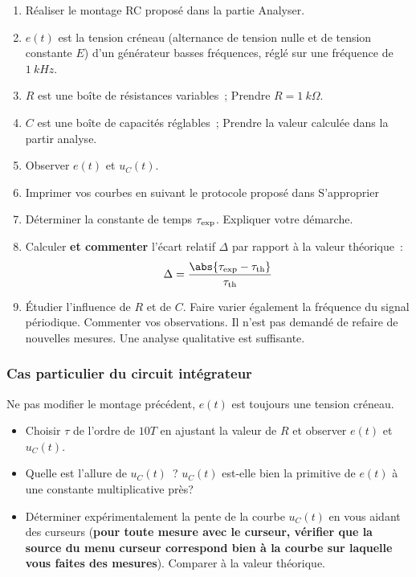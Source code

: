 \documentclass[../main/main.tex]{subfiles}
\begin{document}
\begin{enumerate}
	\item Réaliser le montage RC proposé dans la partie Analyser.
	\item $e(t)$ est la tension créneau (alternance de tension nulle et de
	      tension constante $E$) d'un générateur basses fréquences, réglé sur une
	      fréquence de $\SI{1}{kHz}$.
	\item $R$ est une boîte de résistances variables~; Prendre $R =
		      \SI{1}{k\Omega}$.
	\item $C$ est une boîte de capacités réglables~; Prendre la valeur calculée
	      dans la partir analyse.
	\item Observer $e(t)$ et $u_{C}(t)$.
	\item Imprimer vos courbes en suivant le protocole proposé dans S'approprier
	\item Déterminer la constante de temps $\tau_{\rm exp}$. Expliquer votre
	      démarche.
	\item Calculer \textbf{et commenter} l'écart relatif $\Delta$ par rapport à
	      la valeur théorique~:
	      \[\Delta = \frac{\abs{\tau_{\rm exp}-\tau_{\rm th}}}{\tau_{\rm th}}\]
	\item Étudier l'influence de $R$ et de $C$. Faire varier également la
	      fréquence du signal périodique. Commenter vos observations. Il n'est pas
	      demandé de refaire de nouvelles mesures. Une analyse qualitative est
	      suffisante.
\end{enumerate}

\subsubsection{Cas particulier du circuit intégrateur}

Ne pas modifier le montage précédent, $e(t)$ est toujours une tension créneau.

\medskip

\begin{itemize}
	\item Choisir $\tau$ de l'ordre de $10 T$ en ajustant la valeur de $R$ et
	      observer $e(t)$ et $u_{C}(t)$.
	\item Quelle est l'allure de $u_{C}(t)$~? $u_{C}(t)$ est-elle bien la
	      primitive de $e(t)$ à une constante multiplicative près?
	\item Déterminer expérimentalement la pente de la courbe $u_{C}(t)$ en vous
	      aidant des curseurs (\textbf{pour toute mesure avec le curseur, vérifier
		      que la source du menu curseur correspond bien à la courbe sur
		      laquelle vous faites des mesures}). Comparer à la valeur théorique.
\end{itemize}
\end{document}
